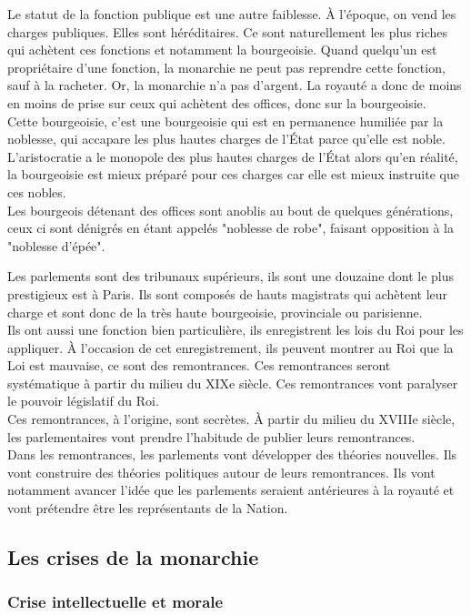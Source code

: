 \documentclass[10pt, a4paper, openany]{book}
\begin{document}
Le statut de la fonction publique est une autre faiblesse. À l'époque, on vend les charges publiques. Elles sont héréditaires. Ce sont naturellement les plus riches qui achètent ces fonctions et notamment la bourgeoisie. Quand quelqu'un est propriétaire d'une fonction, la monarchie ne peut pas reprendre cette fonction, sauf à la racheter. Or, la monarchie n'a pas d'argent. La royauté a donc de moins en moins de prise sur ceux qui achètent des offices, donc sur la bourgeoisie. \\
Cette bourgeoisie, c'est une bourgeoisie qui est en permanence humiliée par la noblesse, qui accapare les plus hautes charges de l'État parce qu'elle est noble. L'aristocratie a le monopole des plus hautes charges de l'État alors qu'en réalité, la bourgeoisie est mieux préparé pour ces charges car elle est mieux instruite que ces nobles. \\
Les bourgeois détenant des offices sont anoblis au bout de quelques générations, ceux ci sont dénigrés en étant appelés "noblesse de robe", faisant opposition à la "noblesse d'épée".


Les parlements sont des tribunaux supérieurs, ils sont une douzaine dont le plus prestigieux est à Paris. Ils sont composés de hauts magistrats qui achètent leur charge et sont donc de la très haute bourgeoisie, provinciale ou parisienne. \\
Ils ont aussi une fonction bien particulière, ils enregistrent les lois du Roi pour les appliquer. À l'occasion de cet enregistrement, ils peuvent montrer au Roi que la Loi est mauvaise, ce sont des remontrances. Ces remontrances seront systématique à partir du milieu du XIXe siècle. Ces remontrances vont paralyser le pouvoir législatif du Roi. \\
Ces remontrances, à l'origine, sont secrètes. À partir du milieu du XVIIIe siècle, les parlementaires vont prendre l'habitude de publier leurs remontrances. \\
Dans les remontrances, les parlements vont développer des théories nouvelles. Ils vont construire des théories politiques autour de leurs remontrances. Ils vont notamment avancer l'idée que les parlements seraient antérieures à la royauté et vont prétendre être les représentants de la Nation. 


\subsection{Les crises de la monarchie}

\subsubsection{Crise intellectuelle et morale}
\end{document}
